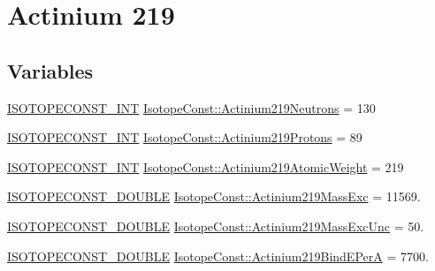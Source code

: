 \hypertarget{group___isotope_const-_actinium-_ac219}{}\section{Actinium 219}
\label{group___isotope_const-_actinium-_ac219}
\subsection*{Variables}
\begin{DoxyCompactItemize}
\item 
\mbox{\hyperlink{group___isotope_const-_macros_ga5f18360b3e99483a35c32d789e62621c}{I\+S\+O\+T\+O\+P\+E\+C\+O\+N\+S\+T\+\_\+\+I\+NT}} \mbox{\hyperlink{group___isotope_const-_actinium-_ac219_ga01965433e6d269f71d035dfaaaf7b50d}{Isotope\+Const\+::\+Actinium219\+Neutrons}} = 130
\item 
\mbox{\hyperlink{group___isotope_const-_macros_ga5f18360b3e99483a35c32d789e62621c}{I\+S\+O\+T\+O\+P\+E\+C\+O\+N\+S\+T\+\_\+\+I\+NT}} \mbox{\hyperlink{group___isotope_const-_actinium-_ac219_ga2b8384a498e8e1e5238c4e22e69836e5}{Isotope\+Const\+::\+Actinium219\+Protons}} = 89
\item 
\mbox{\hyperlink{group___isotope_const-_macros_ga5f18360b3e99483a35c32d789e62621c}{I\+S\+O\+T\+O\+P\+E\+C\+O\+N\+S\+T\+\_\+\+I\+NT}} \mbox{\hyperlink{group___isotope_const-_actinium-_ac219_gaa95faf61b41278d60ad4955a8786118e}{Isotope\+Const\+::\+Actinium219\+Atomic\+Weight}} = 219
\item 
\mbox{\hyperlink{group___isotope_const-_macros_ga8f45a7272ce02c0b4c65c44636ed719a}{I\+S\+O\+T\+O\+P\+E\+C\+O\+N\+S\+T\+\_\+\+D\+O\+U\+B\+LE}} \mbox{\hyperlink{group___isotope_const-_actinium-_ac219_gab9ffe32621b24e3e3148447e00e9cbed}{Isotope\+Const\+::\+Actinium219\+Mass\+Exc}} = 11569.
\item 
\mbox{\hyperlink{group___isotope_const-_macros_ga8f45a7272ce02c0b4c65c44636ed719a}{I\+S\+O\+T\+O\+P\+E\+C\+O\+N\+S\+T\+\_\+\+D\+O\+U\+B\+LE}} \mbox{\hyperlink{group___isotope_const-_actinium-_ac219_ga1951db0d5c506461a67d7bfaaa3f2dd3}{Isotope\+Const\+::\+Actinium219\+Mass\+Exc\+Unc}} = 50.
\item 
\mbox{\hyperlink{group___isotope_const-_macros_ga8f45a7272ce02c0b4c65c44636ed719a}{I\+S\+O\+T\+O\+P\+E\+C\+O\+N\+S\+T\+\_\+\+D\+O\+U\+B\+LE}} \mbox{\hyperlink{group___isotope_const-_actinium-_ac219_gafd7f4ac4fe5034509127da43ff0b24bb}{Isotope\+Const\+::\+Actinium219\+Bind\+E\+PerA}} = 7700.
\item 

\end{DoxyCompactItemize}
